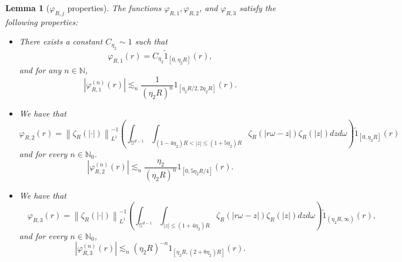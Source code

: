 \documentclass[reqno,11pt]{amsart}
\theoremstyle{plain}
\newtheorem{lemma}[theorem]{Lemma}
\theoremstyle{definition}
\numberwithin{equation}{section}
\numberwithin{theorem}{section}
\def\leq{\leqslant}
\begin{document}
\begin{lemma}[$\varphi_{R, j}$ properties]\label{lemmavarphi}
The functions $\varphi_{R, 1}, \varphi_{R, 2}$, and $\varphi_{R, 3}$ satisfy the following properties:
\begin{itemize}
\item[$(i)$] There exists a constant $C_{\eta_{2}} \sim 1$ such that
$$\varphi_{R, 1}(r)=C_{\eta_{2}} \tilde{1}_{\left[0, \eta_{2} R\right]}(r),$$
and for any $n \in \mathbb{N}$,
$$\left|\varphi_{R, 1}^{(n)}(r)\right| \lesssim_n \frac{1}{\left(\eta_{2} R\right)^{n}} 1_{\left[\eta_{2} R / 2,2 \eta_{2} R\right]}(r).$$

\item[$(ii)$] We have that
\begin{equation}\label{varphi22}
 \varphi_{R, 2}(r)=\left\|\zeta_{R}(|\cdot|)\right\|_{L^{1}}^{-1}\left(\int_{\mathbb{S}^{d-1}} \int_{\left(1-4 \eta_{2}\right) R<|z| \leq\left(1+5 \eta_{2}\right) R} \zeta_{R}(|r \omega-z|) \zeta_{R}(|z|) d z d \omega\right) \tilde{1}_{\left[0, \eta_{2} R\right]}(r)    
\end{equation}
and for every $n \in \mathbb{N}_{0}$.
\begin{equation}\label{varphi2est}
\left|\varphi_{R,2}^{(n)}(r)\right| \lesssim_n \frac{\eta_{2}}{\left(\eta_{2} R\right)^{n}} 1_{\left[0,5 \eta_{2} R / 4\right]}(r).
\end{equation}

\item[$(iii)$] We have that
\begin{equation}\label{varphi32}
\quad \varphi_{R, 3}(r)=\left\|\zeta_{R}(|\cdot|)\right\|_{L^{1}}^{-1}\left(\int_{\mathbb{S}^{d-1}} \int_{|z| \leq\left(1+4 \eta_{2}\right) R} \zeta_{R}(|r \omega-z|) \zeta_{R}(|z|) d z d \omega\right) \tilde{1}_{\left(\eta_{2} R,\infty\right)}(r),
\end{equation}
and for every $n \in \mathbb{N}_{0}$,
\begin{equation}\label{varphi3est}
\left|\varphi_{R, 3}^{(n)}(r)\right| \lesssim_{n}\left(\eta_{2} R\right)^{-n} 1_{\left[\eta_{2} R,\left(2+8 \eta_{2}\right) R\right]}(r).
\end{equation}
\end{itemize}
\end{lemma}
\end{document}
